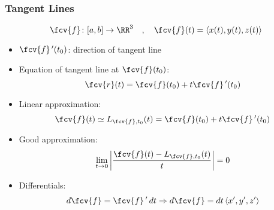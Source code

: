 \begin{frame}
  \frametitle{Tangent Lines}
  $$\fcv{f}\colon [a,b]\to \RR^3\quad , \quad \fcv{f}(t) = \langle x(t), y(t), z(t)\rangle$$
  \begin{itemize}
    \item $\fcv{f}\,'(t_0)$: direction of tangent line
  \item Equation of tangent line at $\fcv{f}(t_0)$:
  $$\fcv{r}(t) = \fcv{f}(t_0) + t \fcv{f}\,'(t_0)$$

  \item Linear approximation:
  $$\fcv{f}(t) \simeq L_{\fcv{f},t_0} (t) = \fcv{f}(t_0) + t \fcv{f}\,'(t_0)$$
  \item Good approximation:
  $$\lim_{t\to 0} \left|\frac{\fcv{f}(t) - L_{\fcv{f},t_0}(t)}{t} \right| =0$$
  \item Differentials:
  $$d\fcv{f} = \fcv{f}\, ' \, dt \Rightarrow d\fcv{f} = dt\, \langle x',y',z' \rangle$$
  \end{itemize}
\end{frame}
